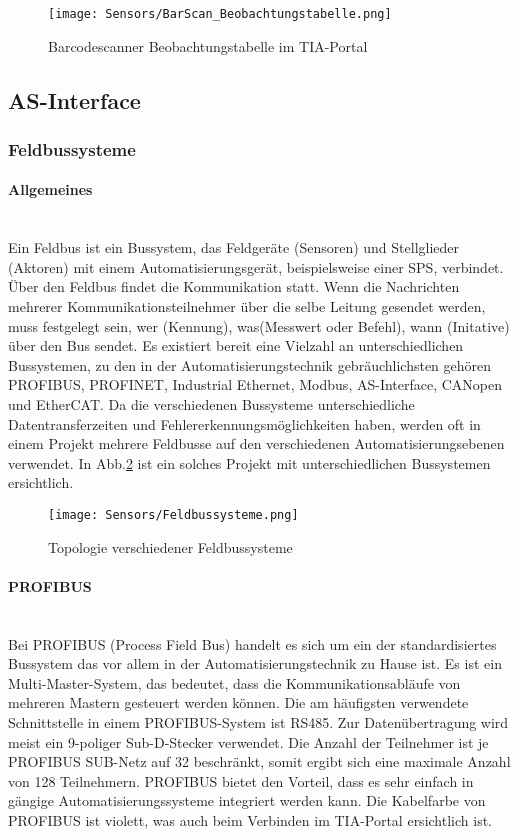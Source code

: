 \begin{figure}[H]
    \centering
    \texttt{[image: Sensors/BarScan\_Beobachtungstabelle.png]}
    \caption{Barcodescanner Beobachtungstabelle im TIA-Portal}
    \label{BarScan_BTabelle}
\end{figure}

\subsection{AS-Interface}
\subsubsection{Feldbussysteme \cite{Feldbussysteme}} \label{sec:Feldbussysteme}
\paragraph{Allgemeines}\mbox{}\\
Ein Feldbus ist ein Bussystem, das Feldgeräte (Sensoren) und Stellglieder (Aktoren) mit einem Automatisierungsgerät, beispielsweise einer SPS, verbindet. Über den Feldbus findet die Kommunikation statt. Wenn die Nachrichten mehrerer Kommunikationsteilnehmer über die selbe Leitung gesendet werden, muss festgelegt sein, wer (Kennung), was(Messwert oder Befehl), wann (Initative) über den Bus sendet. Es existiert bereit eine Vielzahl an unterschiedlichen Bussystemen, zu den in der Automatisierungstechnik gebräuchlichsten gehören PROFIBUS, PROFINET, Industrial Ethernet, Modbus, AS-Interface, CANopen und EtherCAT. Da die verschiedenen Bussysteme unterschiedliche Datentransferzeiten und Fehlererkennungsmöglichkeiten haben, werden oft in einem Projekt mehrere Feldbusse auf den verschiedenen Automatisierungsebenen verwendet. In Abb.\ref{Feldbussysteme} ist ein solches Projekt mit unterschiedlichen Bussystemen ersichtlich.\\

\begin{figure}[H]
    \centering
    \texttt{[image: Sensors/Feldbussysteme.png]}
    \caption{Topologie verschiedener Feldbussysteme \cite{Topologie_Bussysteme}}
    \label{Feldbussysteme}
\end{figure}

\paragraph{PROFIBUS \cite{Profibus}}\mbox{}\\
Bei PROFIBUS (Process Field Bus) handelt es sich um ein der standardisiertes Bussystem das vor allem in der Automatisierungstechnik zu Hause ist. Es ist ein Multi-Master-System, das bedeutet, dass die Kommunikationsabläufe von mehreren Mastern gesteuert werden können. Die am häufigsten verwendete Schnittstelle in einem PROFIBUS-System ist RS485. Zur Datenübertragung wird meist ein 9-poliger Sub-D-Stecker verwendet. Die Anzahl der Teilnehmer ist je PROFIBUS SUB-Netz auf 32 beschränkt, somit ergibt sich eine maximale Anzahl von 128 Teilnehmern. PROFIBUS bietet den Vorteil, dass es sehr einfach in gängige Automatisierungssysteme integriert werden kann. Die Kabelfarbe von PROFIBUS ist violett, was auch beim Verbinden im TIA-Portal ersichtlich ist.

